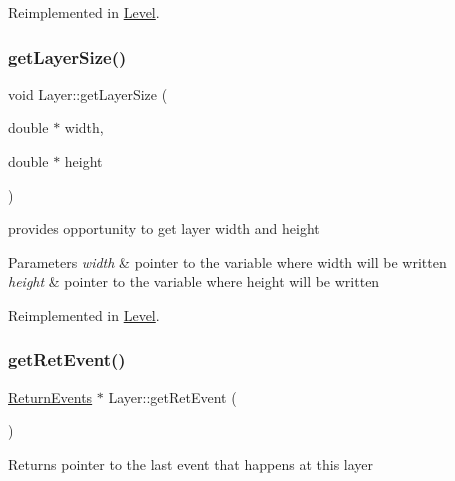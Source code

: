 Reimplemented in \hyperlink{class_level_a4c49b93b4c3060fd650890790fc677e9}{Level}.

\mbox{\label{class_layer_a62b75693308f561bd8454a32dab9e10f}} 
\subsubsection{\texorpdfstring{get\+Layer\+Size()}{getLayerSize()}}
{\footnotesize\ttfamily void Layer\+::get\+Layer\+Size (\begin{DoxyParamCaption}\item[{double $\ast$}]{width,  }\item[{double $\ast$}]{height }\end{DoxyParamCaption})\hspace{0.3cm}{\ttfamily [virtual]}}



provides opportunity to get layer width and height 


\begin{DoxyParams}{Parameters}
{\em width} & pointer to the variable where width will be written \\
\hline
{\em height} & pointer to the variable where height will be written \\
\hline
\end{DoxyParams}


Reimplemented in \hyperlink{class_level_a7909f2ebe4d0f676adf9c84db2c1abc8}{Level}.

\mbox{\label{class_layer_ac57343394c8dba2a180a7762cd3a20b6}} 
\subsubsection{\texorpdfstring{get\+Ret\+Event()}{getRetEvent()}}
{\footnotesize\ttfamily \hyperlink{_events_8h_a51620cf702f1b8fdf47cd0a5cfa0ba4f}{Return\+Events} $\ast$ Layer\+::get\+Ret\+Event (\begin{DoxyParamCaption}{ }\end{DoxyParamCaption})\hspace{0.3cm}{\ttfamily [virtual]}}

\begin{DoxyReturn}{Returns}
pointer to the last event that happens at this layer 
\end{DoxyReturn}
\mbox{\label{class_layer_abd1a2a8242a5d43b389e896a3d3de800}} 
